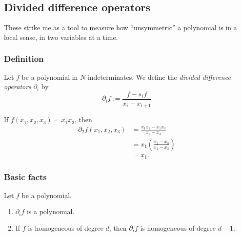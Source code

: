 \documentclass{article}
\begin{document}
\subsection{Divided difference operators}

These strike me as a tool to measure how ``unsymmetric'' a polynomial is in a local sense, in two variables at a time. 

\subsubsection{Definition}

\begin{definition}
    Let $f$ be a polynomial in $N$ indeterminates. 
    We define the \textit{divided difference operators} $\partial_i$ by 
    \begin{equation}
        \partial_i f := \frac{f-s_if}{x_i-x_{i+1}}
    \end{equation}
\end{definition}

\begin{example}
    If $f(x_1, x_2, x_3) = x_1x_2$, then
    \begin{align*}
        \partial_2 f(x_1,x_2,x_3) &= \frac{x_1x_2 - x_1x_3}{x_2 - x_3} \\
                                  &= x_1\left(\frac{x_2-x_3}{x_2-x_3}\right) \\
                                  &= x_1.
    \end{align*}
\end{example}

\subsubsection{Basic facts}

\begin{theorem} 
    Let $f$ be a polynomial.
    \begin{enumerate}[label=(\alph*)]
        \item $\partial_if$ is a polynomial.
        \item If $f$ is homogeneous of degree $d$, then $\partial_if$ is homogeneous of degree $d-1$.
    \end{enumerate}
\end{theorem}
\end{document}
